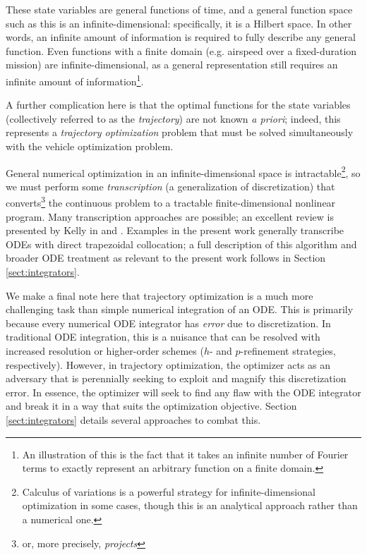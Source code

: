 These state variables are general functions of time, and a general function space such as this is an infinite-dimensional: specifically, it is a Hilbert space. In other words, an infinite amount of information is required to fully describe any general function. Even functions with a finite domain (e.g. airspeed over a fixed-duration mission) are infinite-dimensional, as a general representation still requires an infinite amount of information\footnote{An illustration of this is the fact that it takes an infinite number of Fourier terms to exactly represent an arbitrary function on a finite domain.}.

A further complication here is that the optimal functions for the state variables (collectively referred to as the \textit{trajectory}) are not known \textit{a priori}; indeed, this represents a \textit{trajectory optimization} problem that must be solved simultaneously with the vehicle optimization problem.

General numerical optimization in an infinite-dimensional space is intractable\footnote{Calculus of variations is a powerful strategy for infinite-dimensional optimization in some cases, though this is an analytical approach rather than a numerical one.}, so we must perform some \textit{transcription} (a generalization of discretization) that converts\footnote{or, more precisely, \textit{projects}} the continuous problem to a tractable finite-dimensional nonlinear program. Many transcription approaches are possible; an excellent review is presented by Kelly in \cite{mpk2015} and \cite{mpk2017}. Examples in the present work generally transcribe ODEs with direct trapezoidal collocation; a full description of this algorithm and broader ODE treatment as relevant to the present work follows in Section \ref{sect:integrators}.

We make a final note here that trajectory optimization is a much more challenging task than simple numerical integration of an ODE. This is primarily because every numerical ODE integrator has \textit{error} due to discretization. In traditional ODE integration, this is a nuisance that can be resolved with increased resolution or higher-order schemes ($h$- and $p$-refinement strategies, respectively). However, in trajectory optimization, the optimizer acts as an adversary that is perennially seeking to exploit and magnify this discretization error. In essence, the optimizer will seek to find any flaw with the ODE integrator and break it in a way that suits the optimization objective. Section \ref{sect:integrators} details several approaches to combat this.


